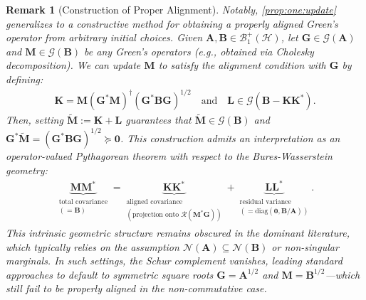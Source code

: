 \documentclass[noinfoline]{imsart}\setcounter{tocdepth}{2}
\newcommand{\m}[1]{\mathbf{#1}}
\renewcommand{\c}[1]{\mathcal{#1}}
\theoremstyle{plain}
\newtheorem{remark}{Remark}[section]
\begin{document}
\begin{remark}[Construction of Proper Alignment]\label{rmk:one:update}
Notably, \cref{prop:one:update} generalizes to a constructive method for obtaining a properly aligned Green's operator from arbitrary initial choices. Given $\m{A}, \m{B} \in \c{B}_{1}^{+}(\c{H})$, let $\m{G} \in \c{G}(\m{A})$ and $\m{M} \in \c{G}(\m{B})$ be any Green's operators (e.g., obtained via Cholesky decomposition). We can update $\m{M}$ to satisfy the alignment condition with $\m{G}$ by defining:
\begin{align*}
    \m{K} = \m{M} (\m{G}^{*} \m{M})^{\dagger} (\m{G}^{*} \m{B} \m{G})^{1/2} \quad \text{and} \quad \m{L} \in \c{G}(\m{B} - \m{K} \m{K}^{*}).
\end{align*}
Then, setting $\widetilde{\m{M}} := \m{K} + \m{L}$ guarantees that $\widetilde{\m{M}} \in \c{G}(\m{B})$ and $\m{G}^{*} \widetilde{\m{M}} = (\m{G}^{*} \m{B} \m{G})^{1/2} \succeq \m{0}$. This construction admits an interpretation as an operator-valued Pythagorean theorem with respect to the Bures-Wasserstein geometry:
\begin{align*}
    \underbrace{\m{M} \m{M}^{*}}_{\substack{\text{total covariance} \\ (= \m{B})}} = \underbrace{\m{K} \m{K}^{*}}_{\substack{\text{aligned covariance} \\ (\text{projection onto } \c{R}(\m{M}^{*}\m{G}))}} + \underbrace{\m{L} \m{L}^{*}}_{\substack{\text{residual variance} \\ (= \text{diag}(\m{0}, \m{B}/\m{A}))}}.
\end{align*}
This intrinsic geometric structure remains obscured in the dominant literature, which typically relies on the assumption $\c{N}(\m{A}) \subseteq \c{N}(\m{B})$ or non-singular marginals. In such settings, the Schur complement vanishes, leading standard approaches to default to symmetric square roots $\m{G}=\m{A}^{1/2}$ and $\m{M}=\m{B}^{1/2}$—which still fail to be properly aligned in the non-commutative case.
\end{remark}
\end{document}
